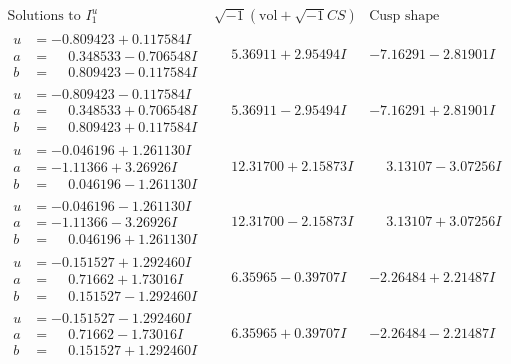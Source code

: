 \documentclass[1p]{elsarticle_modified}
\theoremstyle{definition}
\newcommand{\I}{\sqrt{-1}}
\begin{document}
$$\begin{array}{c|c|c}  
\text{Solutions to }I^u_{1}& \I (\text{vol} + \sqrt{-1}CS) & \text{Cusp shape}\\
 \hline 
\begin{aligned}
u &= -0.809423 + 0.117584 I \\
a &= \phantom{-}0.348533 - 0.706548 I \\
b &= \phantom{-}0.809423 - 0.117584 I\end{aligned}
 & \phantom{-}5.36911 + 2.95494 I & -7.16291 - 2.81901 I \\ \hline\begin{aligned}
u &= -0.809423 - 0.117584 I \\
a &= \phantom{-}0.348533 + 0.706548 I \\
b &= \phantom{-}0.809423 + 0.117584 I\end{aligned}
 & \phantom{-}5.36911 - 2.95494 I & -7.16291 + 2.81901 I \\ \hline\begin{aligned}
u &= -0.046196 + 1.261130 I \\
a &= -1.11366 + 3.26926 I \\
b &= \phantom{-}0.046196 - 1.261130 I\end{aligned}
 & \phantom{-}12.31700 + 2.15873 I & \phantom{-}3.13107 - 3.07256 I \\ \hline\begin{aligned}
u &= -0.046196 - 1.261130 I \\
a &= -1.11366 - 3.26926 I \\
b &= \phantom{-}0.046196 + 1.261130 I\end{aligned}
 & \phantom{-}12.31700 - 2.15873 I & \phantom{-}3.13107 + 3.07256 I \\ \hline\begin{aligned}
u &= -0.151527 + 1.292460 I \\
a &= \phantom{-}0.71662 + 1.73016 I \\
b &= \phantom{-}0.151527 - 1.292460 I\end{aligned}
 & \phantom{-}6.35965 - 0.39707 I & -2.26484 + 2.21487 I \\ \hline\begin{aligned}
u &= -0.151527 - 1.292460 I \\
a &= \phantom{-}0.71662 - 1.73016 I \\
b &= \phantom{-}0.151527 + 1.292460 I\end{aligned}
 & \phantom{-}6.35965 + 0.39707 I & -2.26484 - 2.21487 I \\ \hline\begin{aligned}

\end{aligned}
\end{array}$$
\end{document}
